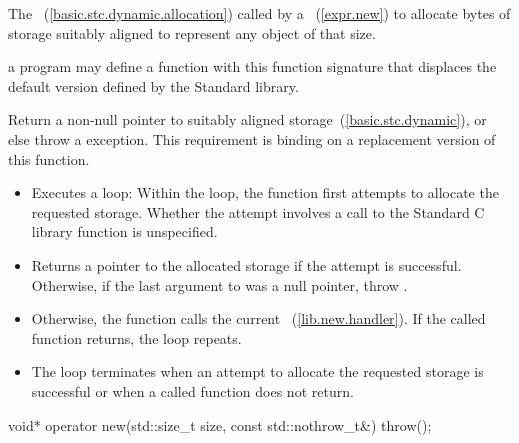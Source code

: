 \begin{itemdescr}
\pnum
\effects
The
~(\ref{basic.stc.dynamic.allocation})
called by a
~(\ref{expr.new})
to allocate
 bytes of storage suitably aligned to represent any object
of that size.

\pnum
\replaceable
a \Cpp program may define a function with this function signature
that displaces the default version defined by the
\Cpp Standard library.

\pnum
\required 
Return a non-null pointer to suitably aligned storage~(\ref{basic.stc.dynamic}),
or else throw a
%
exception.
This requirement is binding on a replacement version of this function.

\pnum
{}

\begin{itemize}
\item
Executes a loop:
Within the loop, the function first attempts to allocate the requested storage.
Whether the attempt involves a call to the Standard C library function
is unspecified.
%
\item
Returns a pointer to the allocated storage if the attempt is successful.
Otherwise, if the last argument to
was a null pointer, throw
.
\item
Otherwise, the function calls the current
~(\ref{lib.new.handler}).
If the called function returns, the loop repeats.
\item
The loop terminates when an attempt to allocate the requested storage is
successful or when a called
function does not return.
\end{itemize}
\end{itemdescr}

%
\begin{itemdecl}
void* operator new(std::size_t size, const std::nothrow_t&) throw();
\end{itemdecl}

